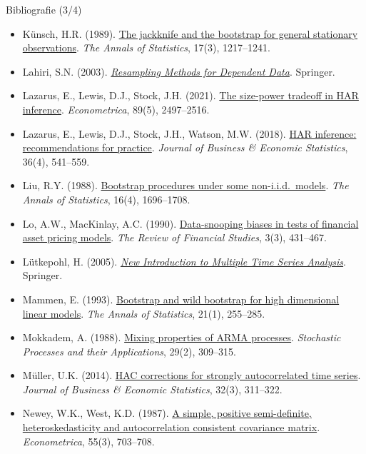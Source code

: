 \begin{frame}{Bibliografie (3/4)}
\itemsize{\tiny}
\begin{itemize}
    \item Künsch, H.R. (1989). \href{https://doi.org/10.1214/aos/1176347265}{The jackknife and the bootstrap for general stationary observations}. \emph{The Annals of Statistics}, 17(3), 1217--1241.
    \item Lahiri, S.N. (2003). \href{https://doi.org/10.1007/978-1-4757-3803-2}{\emph{Resampling Methods for Dependent Data}}. Springer.
    \item Lazarus, E., Lewis, D.J., Stock, J.H. (2021). \href{https://doi.org/10.3982/ECTA15404}{The size-power tradeoff in HAR inference}. \emph{Econometrica}, 89(5), 2497--2516.
    \item Lazarus, E., Lewis, D.J., Stock, J.H., Watson, M.W. (2018). \href{https://doi.org/10.1080/07350015.2018.1506926}{HAR inference: recommendations for practice}. \emph{Journal of Business \& Economic Statistics}, 36(4), 541--559.
    \item Liu, R.Y. (1988). \href{https://doi.org/10.1214/aos/1176351062}{Bootstrap procedures under some non-i.i.d.\ models}. \emph{The Annals of Statistics}, 16(4), 1696--1708.
    \item Lo, A.W., MacKinlay, A.C. (1990). \href{https://doi.org/10.1093/rfs/3.3.431}{Data-snooping biases in tests of financial asset pricing models}. \emph{The Review of Financial Studies}, 3(3), 431--467.
    \item Lütkepohl, H. (2005). \href{https://doi.org/10.1007/978-3-540-27752-1}{\emph{New Introduction to Multiple Time Series Analysis}}. Springer.
    \item Mammen, E. (1993). \href{https://doi.org/10.1214/aos/1176349025}{Bootstrap and wild bootstrap for high dimensional linear models}. \emph{The Annals of Statistics}, 21(1), 255--285.
    \item Mokkadem, A. (1988). \href{https://doi.org/10.1016/0304-4149(88)90045-2}{Mixing properties of ARMA processes}. \emph{Stochastic Processes and their Applications}, 29(2), 309--315.
    \item Müller, U.K. (2014). \href{https://doi.org/10.1080/07350015.2014.931238}{HAC corrections for strongly autocorrelated time series}. \emph{Journal of Business \& Economic Statistics}, 32(3), 311--322.
    \item Newey, W.K., West, K.D. (1987). \href{https://doi.org/10.2307/1913610}{A simple, positive semi-definite, heteroskedasticity and autocorrelation consistent covariance matrix}. \emph{Econometrica}, 55(3), 703--708.

\end{itemize}
\end{frame}
